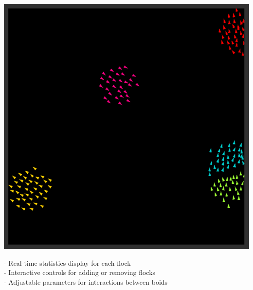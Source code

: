 \documentclass[10pt,a4paper]{article}
\begin{document}
\begin{center}
    \includegraphics[width=1.0\textwidth]{../images/interface.png}
\end{center}


- Real-time statistics display for each flock \\
- Interactive controls for adding or removing flocks \\
- Adjustable parameters for interactions between boids \\
\end{document}
